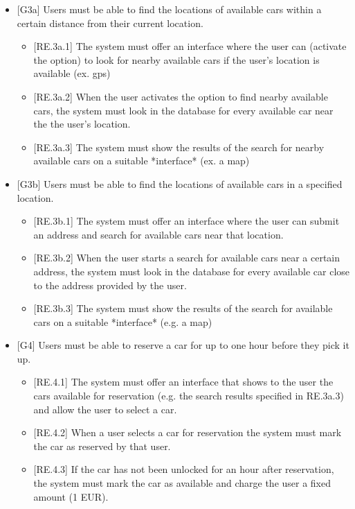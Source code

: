\documentclass[english]{article}
\begin{document}
\begin{itemize}
\item{[G3a] Users must be able to find the locations of available cars within a certain distance from their current location.
\begin{itemize}
	\item{[RE.3a.1] The system must offer an interface where the user can (activate the option) to look for nearby available cars if the user’s location is available (ex. gps)}
	\item{[RE.3a.2] When the user activates the option to find nearby available cars, the system must look in the database for every available car near the the user’s location.}
	\item{[RE.3a.3] The system must show the results of the search for nearby available cars on a suitable *interface* (ex. a map)}
\end{itemize}
}

\item{[G3b] Users must be able to find the locations of available cars in a specified location.
\begin{itemize}
	\item{[RE.3b.1] The system must offer an interface where the user can submit an address and search for available cars near that location.}
	\item{[RE.3b.2] When the user starts a search for available cars near a certain address, the system must look in the database for every available car close to the address provided by the user.}
	\item{[RE.3b.3] The system must show the results of the search for available cars on a suitable *interface* (e.g. a map)}
\end{itemize}
}

\item{[G4] Users must be able to reserve a car for up to one hour before they pick it up.
\begin{itemize}
	\item{[RE.4.1] The system must offer an interface that shows to the user the cars available for reservation (e.g. the search results specified in RE.3a.3) and allow the user to select a car.}
	\item{[RE.4.2] When a user selects a car for reservation the system must mark the car as reserved by that user.}
	\item{[RE.4.3] If the car has not been unlocked for an hour after reservation, the system must mark the car as available and charge the user a fixed amount (1 EUR).}
	

\end{itemize}}
\end{itemize}
\end{document}
